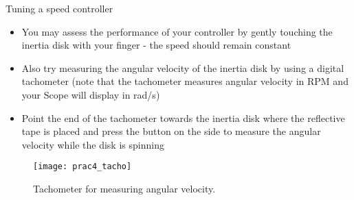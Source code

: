 \documentclass[9pt]{beamer-control}
\begin{document}
\begin{frame}{Tuning a speed controller}
\begin{itemize}
	\item You may assess the performance of your controller by gently touching the inertia disk with your finger - the speed should remain constant
	\item Also try measuring the angular velocity of the inertia disk by using a digital tachometer (note that the tachometer measures angular velocity in RPM and your Scope will display in rad/s)
	\item Point the end of the tachometer towards the inertia disk where the reflective tape is placed and press the button on the side to measure the angular velocity while the disk is spinning
\end{itemize}

\begin{figure}
	\centering
	\texttt{[image: prac4\_tacho]}
	\caption{Tachometer for measuring angular velocity.}
\end{figure}

\end{frame}


\end{document}
